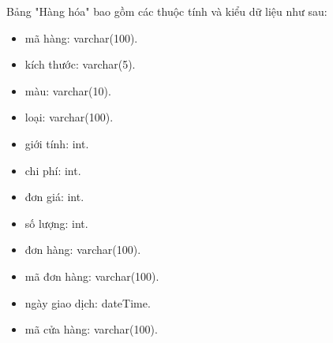 Bảng "Hàng hóa" bao gồm các thuộc tính và kiểu dữ liệu như sau:
\begin{itemize}
	\item mã hàng: varchar(100).
	\item kích thước: varchar(5).
	\item màu: varchar(10).
	\item loại: varchar(100).
	\item giới tính: int.
	\item chi phí: int.
	\item đơn giá: int.
	\item số lượng: int.
	\item đơn hàng: varchar(100).
\end{itemize}

\begin{itemize}
	\item mã đơn hàng: varchar(100).
	\item ngày giao dịch: dateTime.
	\item mã cửa hàng: varchar(100).
\end{itemize}